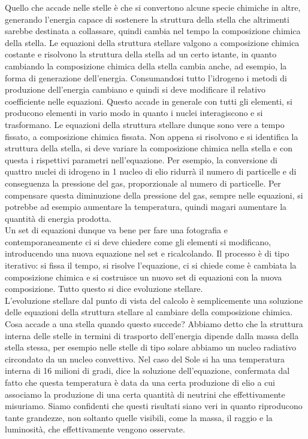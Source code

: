 \documentclass[a4paper,11pt]{article}
\begin{document}
    Quello che accade nelle stelle è che si convertono alcune specie chimiche in altre, generando l'energia capace di sostenere la struttura della stella che altrimenti sarebbe destinata a collassare, quindi cambia nel tempo la composizione chimica della stella. Le equazioni della struttura stellare valgono a composizione chimica costante e risolvono la struttura della stella ad un certo istante, in quanto cambiando la composizione chimica della stella cambia anche, ad esempio, la forma di generazione dell'energia. Consumandosi tutto l'idrogeno i metodi di produzione dell'energia cambiano e quindi si deve modificare il relativo coefficiente nelle equazioni. Questo accade in generale con tutti gli elementi, si producono elementi in vario modo in quanto i nuclei interagiscono e si trasformano. Le equazioni della struttura stellare dunque sono vere a tempo fissato, a composizione chimica fissata. Non appena si risolvono e si identifica la struttura della stella, si deve variare la composizione chimica nella stella e con questa i rispettivi parametri nell'equazione. Per esempio, la conversione di quattro nuclei di idrogeno in 1 nucleo di elio ridurrà il numero di particelle e di conseguenza la pressione del gas, proporzionale al numero di particelle. Per compensare questa diminuzione della pressione del gas, sempre nelle equazioni, si potrebbe ad esempio aumentare la temperatura, quindi magari aumentare la quantità di energia prodotta.\\
    Un set di equazioni dunque va bene per fare una fotografia e contemporaneamente ci si deve chiedere come gli elementi si modificano, introducendo una nuova equazione nel set e ricalcolando. Il processo è di tipo iterativo: si fissa il tempo, si risolve l'equazione, ci si chiede come è cambiata la composizione chimica e si costruisce un nuovo set di equazioni con la nuova composizione. Tutto questo si dice evoluzione stellare.\\
    L'evoluzione stellare dal punto di vista del calcolo è semplicemente una soluzione delle equazioni della struttura stellare al cambiare della composizione chimica. Cosa accade a una stella quando questo succede? Abbiamo detto che la struttura interna delle stelle in termini di trasporto dell'energia dipende dalla massa della stella stessa, per esempio nelle stelle di tipo solare abbiamo un nucleo radiativo circondato da un nucleo convettivo. Nel caso del Sole si ha una temperatura interna di 16 milioni di gradi, dice la soluzione dell'equazione, confermata dal fatto che questa temperatura è data da una certa produzione di elio a cui associamo la produzione di una certa quantità di neutrini che effettivamente misuriamo. Siamo confidenti che questi risultati siano veri in quanto riproducono tante grandezze, non soltanto quelle visibili, come la massa, il raggio e la luminosità, che effettivamente vengono osservate. \\
\end{document}
